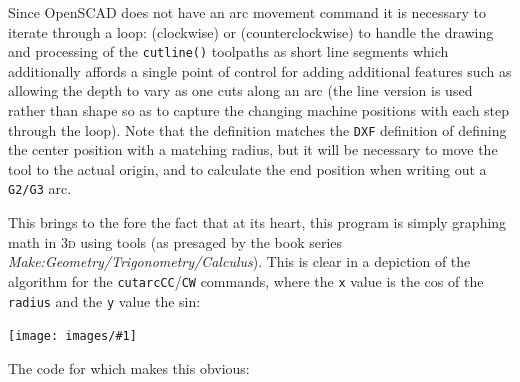 \documentclass{ltxdoc}
\newcommand{\includeimage}[1]{\bigskip\noindent\texttt{[image: images/\#1]}\bigskip}
\begin{document}
Since OpenSCAD does not have an arc movement command it is necessary to iterate through a loop:  (clockwise) or  (counterclockwise) to handle the drawing and processing of the \texttt{cutline()} toolpaths as short line segments which additionally affords a single point of control for adding additional features such as allowing the depth to  vary as one cuts along an arc (the line version is used rather than shape so as to capture the changing machine positions with each step through the loop). Note that the definition matches the \verb|DXF| definition of defining the center position with a matching radius, but it will be necessary to move the tool to the actual origin, and to calculate the end position when writing out a \verb|G2/G3| arc.

This brings to the fore the fact that at its heart, this program is simply graphing math in \textsc{3d} using tools (as presaged by the book series \emph{Make:Geometry/Trigonometry/Calculus}). This is clear in a depiction of the algorithm for the \verb|cutarcCC|/\verb|CW| commands, where the \verb|x| value is the \textsf{cos} of the \verb|radius| and the \verb|y| value the \textsf{sin}:

\includeimage{gcp_statemachine_arc_50_0_0_0_0_0.png}

The code for which makes this obvious:
\end{document}
